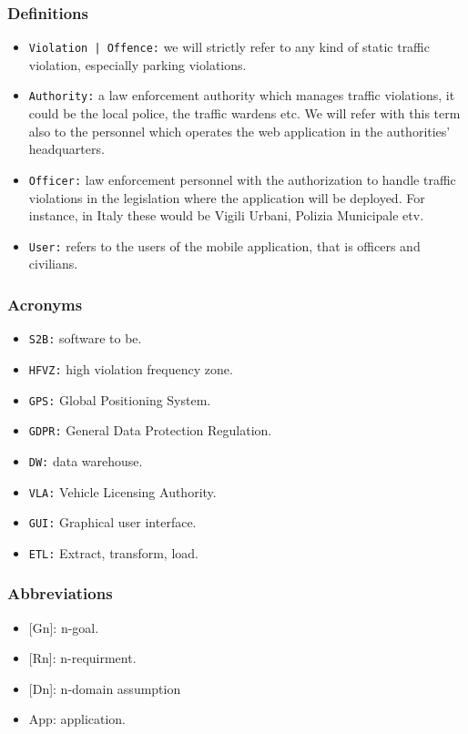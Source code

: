 \documentclass[12pt,a4paper]{article}
\begin{document}
\subsubsection{Definitions}
 \begin{itemize}
\item \texttt{Violation | Offence:} we will strictly refer to any kind of static traffic violation, especially parking violations. 
\item \texttt{Authority:} a law enforcement authority which manages traffic violations, it could be the local police, the traffic wardens etc. We will refer with this term also to the personnel which operates the web application in the authorities' headquarters.
\item \texttt{Officer:} law enforcement personnel with the authorization to handle traffic violations in the legislation where the application will be deployed. For instance, in Italy these would be Vigili Urbani, Polizia Municipale etv.
\item \texttt{User:} refers to the users of the mobile application, that is officers and civilians.
\end{itemize}
\subsubsection{Acronyms}
\begin{itemize}
\item \texttt{S2B:} software to be.
\item \texttt{HFVZ:} high violation frequency zone.
\item \texttt{GPS:} Global Positioning System.
\item \texttt{GDPR:} General Data Protection Regulation.
\item \texttt{DW:} data warehouse.
\item \texttt{VLA:} Vehicle Licensing Authority.
\item \texttt{GUI:} Graphical user interface.
\item \texttt{ETL:} Extract, transform, load.
\end{itemize}
\subsubsection{Abbreviations}
\begin{itemize}
				\item {[Gn]}: n-goal.
				\item {[Rn]}: n-requirment.
				\item {[Dn]}: n-domain assumption
				\item {App}: application.
			\end{itemize}
\end{document}
